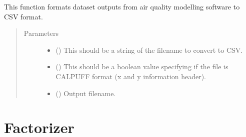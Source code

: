 \documentclass[letterpaper,10pt,english,openany,oneside]{sphinxmanual}
\begin{document}
\begin{fulllineitems}
\label{\detokenize{index:CSVFormatter.csvformatter}}
This function formats dataset outputs from air quality modelling software to CSV format.
\begin{quote}\begin{description}
\item[{Parameters}] \leavevmode\begin{itemize}
\item {} 
 () \textendash{} This should be a string of the filename to convert to CSV.

\item {} 
 () \textendash{} This should be a boolean value specifying if the file is CALPUFF format (x and y information header).

\item {} 
 () \textendash{} Output filename.

\end{itemize}

\end{description}\end{quote}

\end{fulllineitems}



\chapter{Factorizer}
\label{\detokenize{index:module-Factorizer}}\label{\detokenize{index:factorizer}}
\end{document}
